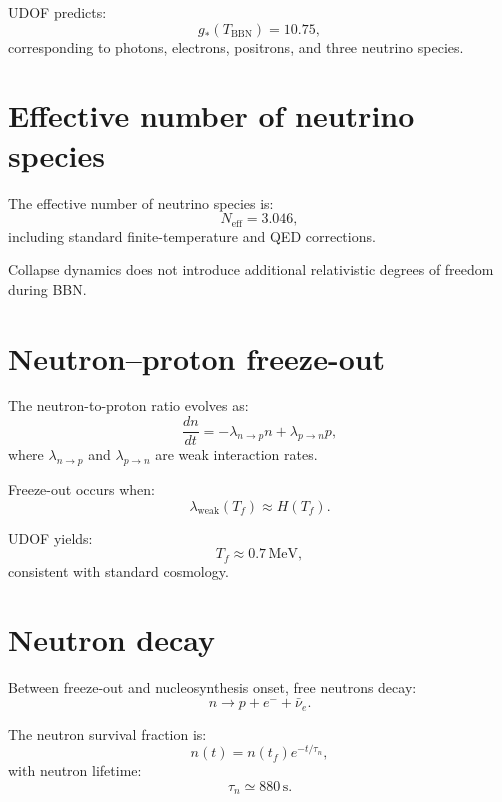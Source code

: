 \documentclass[11pt]{book}
\begin{document}
UDOF predicts:
\begin{equation}
g_\ast(T_{\mathrm{BBN}}) = 10.75,
\end{equation}
corresponding to photons, electrons, positrons, and three neutrino species.

\section{Effective number of neutrino species}

The effective number of neutrino species is:
\begin{equation}
N_{\mathrm{eff}} = 3.046,
\end{equation}
including standard finite-temperature and QED corrections.

Collapse dynamics does not introduce additional relativistic degrees of
freedom during BBN.

\section{Neutron--proton freeze-out}

The neutron-to-proton ratio evolves as:
\begin{equation}
\frac{dn}{dt} =
-\lambda_{n\to p} n
+ \lambda_{p\to n} p,
\end{equation}
where $\lambda_{n\to p}$ and $\lambda_{p\to n}$ are weak interaction rates.

Freeze-out occurs when:
\begin{equation}
\lambda_{\mathrm{weak}}(T_f) \approx H(T_f).
\end{equation}

UDOF yields:
\begin{equation}
T_f \approx 0.7\,\mathrm{MeV},
\end{equation}
consistent with standard cosmology.

\section{Neutron decay}

Between freeze-out and nucleosynthesis onset, free neutrons decay:
\begin{equation}
n \to p + e^- + \bar{\nu}_e.
\end{equation}

The neutron survival fraction is:
\begin{equation}
n(t) = n(t_f) e^{-t/\tau_n},
\end{equation}
with neutron lifetime:
\begin{equation}
\tau_n \simeq 880\,\mathrm{s}.
\end{equation}
\end{document}
